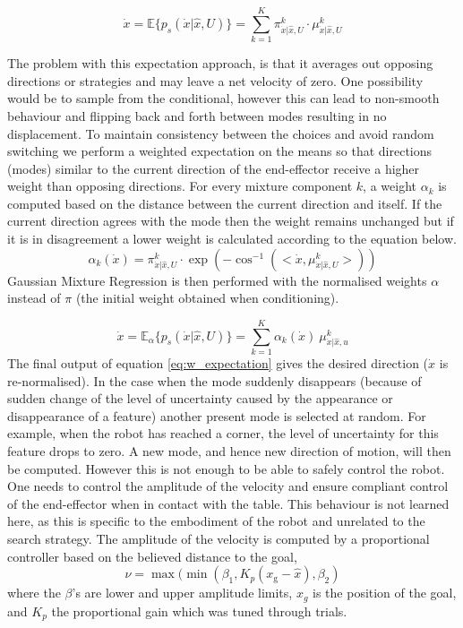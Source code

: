 \begin{equation} \label{eq:GMR}
 \dot{x} = \mathbb{E}\{p_s(\dot{x}|\hat{x},U)\} = \sum\limits_{k=1}^{K}  \pi^{k}_{\dot{x}|\hat{x},U} \cdot \mu^{k}_{\dot{x}|\hat{x},U}
\end{equation}

The problem with this expectation approach, is that it averages out opposing directions or strategies and may leave 
a net velocity of zero. One possibility would be to sample from the conditional, however this can lead to non-smooth 
behaviour and flipping back and forth between modes resulting in no displacement. To maintain consistency between the
choices and avoid random switching  we perform a weighted expectation on the means so that 
directions (modes) similar to the current direction of the end-effector receive
a higher weight than opposing directions. For every mixture component $k$, a weight $\alpha_k$ is computed based 
on the distance between the current direction and itself.
If the current direction agrees with the mode then the weight remains unchanged but if it is in
disagreement a lower weight is
calculated according to the equation below. 
\begin{equation}  \label{eq:weight}
  \alpha_{k}(\dot{x}) = \pi^{k}_{\dot{x}|\hat{x},U} \cdot \exp(-\cos^{-1}(<\dot{x},\mu^{k}_{\dot{x}|\hat{x},U}>))
\end{equation}
Gaussian Mixture Regression is then performed with the normalised  weights $\alpha$ instead of $\pi$
(the initial weight obtained when conditioning).

\begin{equation}\label{eq:w_expectation}
 \dot{x} = \mathbb{E}_{\alpha}\{p_s(\dot{x}|\hat{x},U)\} = \sum\limits_{k=1}^{K} \alpha_{k}(\dot{x}) \:\mu^{k}_{\dot{x}|\hat{x},u}
\end{equation}
% 
%
The final output of equation \ref{eq:w_expectation} gives the desired direction
($\dot{x}$ is re-normalised). In the case when the mode suddenly disappears
(because of sudden change of the level of uncertainty caused by the appearance or disappearance of a feature)
another present mode is selected at random. For example, when the robot has reached a corner, the level of uncertainty for this feature drops to zero.
A new mode, and hence new direction of motion, will then  be computed.
However this is not enough to be able to safely control the robot.
One needs to control the amplitude of the velocity and ensure compliant control 
of the end-effector when in contact with the table. This behaviour is not learned here, as this is specific to 
the embodiment of the robot and unrelated to the search strategy. The 
amplitude of the velocity is computed by a proportional controller based on the
believed distance to the goal,
\begin{equation}
 \nu = \max(\min(\beta_{1},K_{p}(x_{\mathrm{g}} - \hat{x}),\beta_{2})
\end{equation}
where the $\beta$'s are lower and upper amplitude limits, $x_{g}$ is the
position of the goal, and $K_{p}$ the proportional gain which was tuned through
trials.

